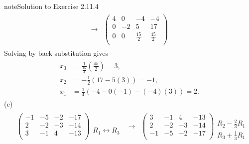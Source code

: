 \documentclass[letterpaper,10pt,english]{jupyterBook}
\begin{document}
\begin{sphinxadmonition}{note}{Solution to Exercise 2.11.4}
\begin{equation*}
\begin{split}
\begin{align*}
    \longrightarrow 
    & \left( \begin{array}{ccc|c} 
         4 & 0 & -4 & -4 \\ 
         0 & -2 & 5 & 17 \\ 
         0 & 0 & \frac{15}{2} & \frac{45}{2} \\ 
    \end{array} \right) 
\end{align*} \end{split}
\end{equation*}
\sphinxAtStartPar
Solving by back substitution gives
\begin{equation*}
\begin{split} \begin{align*} 
    x_{3} &=  \frac{1}{\frac{15}{2}} \left( \frac{45}{2} \right) = 3, \\ 
    x_{2} &=  - \frac{1}{2} \left( 17 - 5 \left( 3 \right) \right) = -1, \\ 
    x_{1} &=  \frac{1}{4} \left( -4 - 0 \left( -1 \right) - \left( -4 \right) \left( 3 \right) \right) = 2. 
\end{align*} \end{split}
\end{equation*}
\sphinxAtStartPar
(c)
\begin{equation*}
\begin{split} \begin{align*} 
    & \left( \begin{array}{ccc|c} 
         -1 & -5 & -2 & -17 \\ 
         2 & -2 & -3 & -14 \\ 
         3 & -1 & 4 & -13 \\ 
    \end{array} \right) 
    \begin{array}{l} \phantom{x} \\ \phantom{x} \\ R_{1} \leftrightarrow R_{3} \\ \end{array} & 
    \longrightarrow 
    & \left( \begin{array}{ccc|c} 
         3 & -1 & 4 & -13 \\ 
         2 & -2 & -3 & -14 \\ 
         -1 & -5 & -2 & -17 \\ 
    \end{array} \right) 
    \begin{array}{l} \phantom{x} \\ R_{2} - \frac{2}{3} R_{1} \\ R_{3} + \frac{1}{3} R_{1}\end{array} \\ \\ 

\end{align*}
\end{split}
\end{equation*}
\end{sphinxadmonition}
\end{document}
